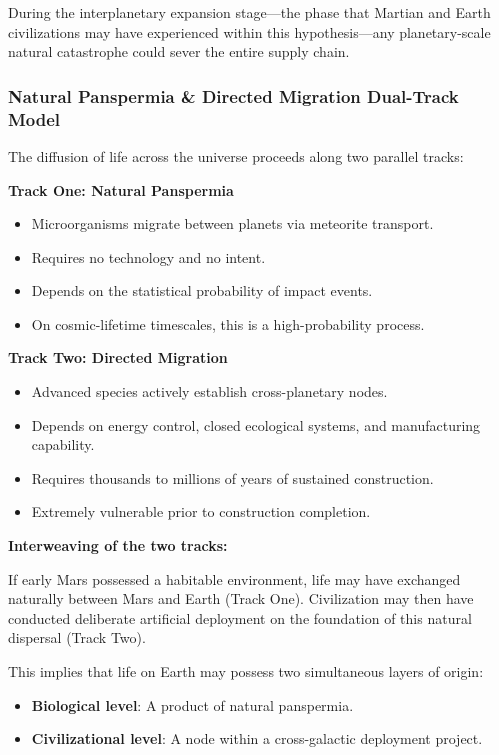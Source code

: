 \documentclass[aps,prd,twocolumn,superscriptaddress,nofootinbib]{revtex4-2}
\begin{document}
During the interplanetary expansion stage---the phase that Martian and Earth civilizations may have experienced within this hypothesis---any planetary-scale natural catastrophe could sever the entire supply chain.

\subsubsection{Natural Panspermia \& Directed Migration Dual-Track Model}\label{sec:dual-track}

The diffusion of life across the universe proceeds along two parallel tracks:

\textbf{Track One: Natural Panspermia}
\begin{itemize}
  \item Microorganisms migrate between planets via meteorite transport.
  \item Requires no technology and no intent.
  \item Depends on the statistical probability of impact events.
  \item On cosmic-lifetime timescales, this is a high-probability process.
\end{itemize}

\textbf{Track Two: Directed Migration}
\begin{itemize}
  \item Advanced species actively establish cross-planetary nodes.
  \item Depends on energy control, closed ecological systems, and manufacturing capability.
  \item Requires thousands to millions of years of sustained construction.
  \item Extremely vulnerable prior to construction completion.
\end{itemize}

\textbf{Interweaving of the two tracks:}

If early Mars possessed a habitable environment, life may have exchanged naturally between Mars and Earth (Track One). Civilization may then have conducted deliberate artificial deployment on the foundation of this natural dispersal (Track Two).

This implies that life on Earth may possess two simultaneous layers of origin:
\begin{itemize}
  \item \textbf{Biological level}: A product of natural panspermia.
  \item \textbf{Civilizational level}: A node within a cross-galactic deployment project.
\end{itemize}
\end{document}
